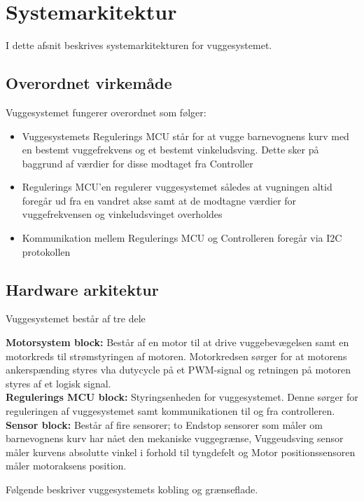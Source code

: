 \section{Systemarkitektur}

I dette afsnit beskrives systemarkitekturen for vuggesystemet.

\subsection*{Overordnet virkemåde}
Vuggesystemet fungerer overordnet som følger:
\begin{itemize}
	\item Vuggesystemets Regulerings MCU står for at vugge barnevognens kurv med en bestemt vuggefrekvens og et bestemt vinkeludsving. Dette sker på baggrund af værdier for disse modtaget fra Controller
	\item Regulerings MCU'en regulerer vuggesystemet således at vugningen altid foregår ud fra en vandret akse samt at de modtagne værdier for vuggefrekvensen og vinkeludsvinget overholdes  
	\item Kommunikation mellem Regulerings MCU og Controlleren foregår via I2C protokollen
\end{itemize}

\subsection{Hardware arkitektur}


Vuggesystemet består af tre dele

\textbf{Motorsystem block:} Består af en motor til at drive vuggebevægelsen samt en motorkreds til strømstyringen af motoren. Motorkredsen sørger for at motorens ankerspænding styres vha dutycycle på et PWM-signal og retningen på motoren styres af et logisk signal.\\
\textbf{Regulerings MCU block:} Styringsenheden for vuggesystemet. Denne sørger for reguleringen af vuggesystemet samt kommunikationen til og fra controlleren.\\
\textbf{Sensor block:} Består af fire sensorer; to Endstop sensorer som måler om barnevognens kurv har nået den mekaniske vuggegrænse, Vuggeudsving sensor måler kurvens absolutte vinkel i forhold til tyngdefelt og Motor positionssensoren måler motoraksens position.


Følgende beskriver vuggesystemets kobling og grænseflade.

